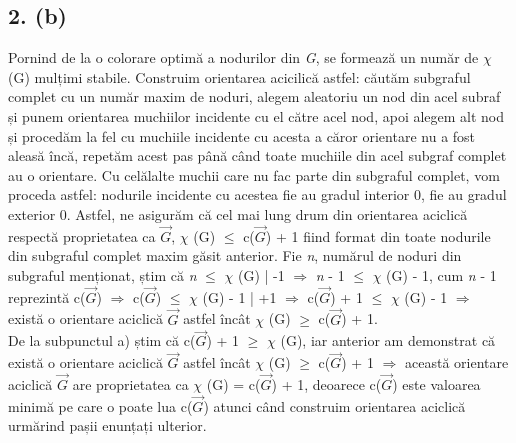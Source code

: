 \documentclass[12pt] {fphw}
\begin{document}
\subsection*{2. (b)} 
        Pornind de la o colorare optimă a nodurilor din \textit{G}, se formează un număr de $\chi$ (G) mulțimi stabile. Construim orientarea acicilică astfel: căutăm subgraful complet cu un număr maxim de noduri, alegem aleatoriu un nod din acel subraf și punem orientarea muchiilor incidente cu el către acel nod, apoi alegem alt nod și procedăm la fel cu muchiile incidente cu acesta a căror orientare nu a fost aleasă încă, repetăm acest pas până când toate muchiile din acel subgraf complet au o orientare. Cu celălalte muchii care nu fac parte din subgraful complet, vom proceda astfel: nodurile incidente cu acestea fie au gradul interior 0, fie au gradul exterior 0. Astfel, ne asigurăm că cel mai lung drum din orientarea aciclică respectă proprietatea ca {$\vec{G}$}, $\chi$ (G) $\leq$  c({$\vec{G}$}) + 1 fiind format din toate nodurile din subgraful complet maxim găsit anterior. Fie \textit{n}, numărul de noduri din subgraful menționat, știm că \textit{n} $\leq$ $\chi$ (G) | -1    $\Rightarrow$  \textit{n} - 1 $\leq$ $\chi$ (G) - 1, cum  \textit{n} - 1  reprezintă c({$\vec{G}$}) $\Rightarrow$ c({$\vec{G}$}) $\leq$ $\chi$ (G) - 1 | +1 $\Rightarrow$  c({$\vec{G}$}) + 1 $\leq$ $\chi$ (G) - 1 $\Rightarrow$ există o orientare aciclică {$\vec{G}$} astfel încât $\chi$ (G) $\geq$  c({$\vec{G}$}) + 1. \\ 
   
             De la subpunctul a) știm că c({$\vec{G}$}) + 1 $\geq$ $\chi$ (G), iar anterior am demonstrat că există o orientare aciclică {$\vec{G}$} astfel încât $\chi$ (G)  $\geq$ c({$\vec{G}$}) + 1 $\Rightarrow$ această orientare aciclică {$\vec{G}$} are proprietatea ca $\chi$ (G) = c({$\vec{G}$}) + 1, deoarece  c({$\vec{G}$}) este valoarea minimă pe care o poate lua c({$\vec{G}$}) atunci când construim orientarea aciclică urmărind pașii enunțați ulterior. 




 

 



   
\end{document}
